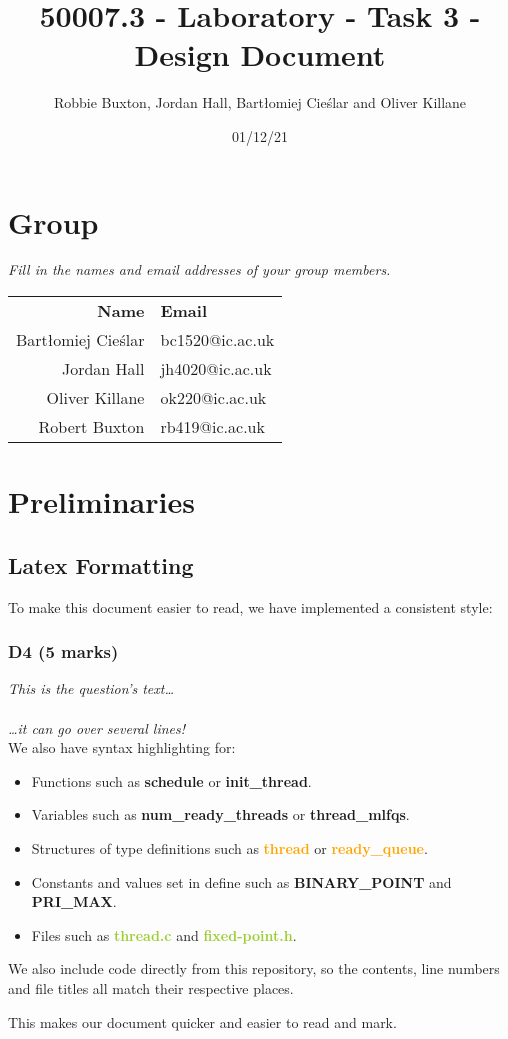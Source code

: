 \documentclass{report}
\title{50007.3 - Laboratory - Task 3 - Design Document}
\author{Robbie Buxton, Jordan Hall, Bartłomiej Cieślar and Oliver Killane}
\date{01/12/21}
\newcommand{\question}[1]{\textit{#1} \ }
\newcommand{\fun}[1]{\textcolor{Emerald}{\textbf{#1}}}
\newcommand{\file}[1]{\textcolor{YellowGreen}{\textbf{#1}}}
\newcommand{\struct}[1]{\textcolor{orange}{\textbf{#1}}}
\newcommand{\var}[1]{\textcolor{RoyalPurple}{\textbf{#1}}}
\newcommand{\const}[1]{\textcolor{BrickRed}{\textbf{#1}}}
\newcommand{\pintoscode}[4]{}
\begin{document}
	\maketitle

	\section*{Group}
		\question{Fill in the names and email addresses of your group members.}
		\begin{center}
			\begin{tabular}{r l}
				\textbf{Name} & \textbf{Email} \\
				Bartłomiej Cieślar & bc1520@ic.ac.uk \\
				Jordan Hall & jh4020@ic.ac.uk \\
				Oliver Killane & ok220@ic.ac.uk \\
				Robert Buxton & rb419@ic.ac.uk \\
			\end{tabular}
		\end{center}
	
	\section*{Preliminaries}
		\subsection*{Latex Formatting}
		To make this document easier to read, we have implemented a consistent style:
		\subsubsection*{D4 (5 marks)}
		\question{This is the question's text\dots
		\\
		\\ \dots it can go over several lines!}
		\\ We also have syntax highlighting for:
		\begin{itemize}
			\item Functions such as \fun{schedule} or \fun{init\_thread}.
			\item Variables such as \var{num\_ready\_threads} or \var{thread\_mlfqs}.
			\item Structures of type definitions such as \struct{thread} or \struct{ready\_queue}.
			\item Constants and values set in define such as \const{BINARY\_POINT} and \const{PRI\_MAX}.
			\item Files such as \file{thread.c} and \file{fixed-point.h}.
		\end{itemize}
		We also include code directly from this repository, so the contents, line 
		numbers and file titles all match their respective places.
		\pintoscode{98}{110}{\file{syscall.c}}{/../userprog/syscall.c}
		This makes our document quicker and easier to read and mark.
\end{document}

